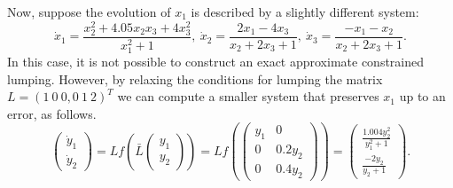Now, suppose the evolution of $x_1$ is described by a slightly different system:
\begin{equation} \label{eq:examplepert}
	\dot{x}_{1} = \frac {x_{2}^{2} +4.05x_{2}x_{3} +4x_{3}^{2}}{x_{1}^{2} + 1 },~
	\dot{x}_{2} = \frac{2x_{1}-4x_{3}}{x_{2}+2x_{3} + 1},~
	\dot{x}_{3} = \frac{-x_{1}-x_{2}}{x_{2}+2x_{3}+1}.
\end{equation}
In this case, it is not possible to construct an exact approximate constrained lumping.
However, by relaxing the conditions for lumping the matrix $L = (1 \ 0\ 0, 0\ 1\  2)^{T}$ we can compute a smaller system that preserves $x_1$ up to an error, as follows.
\begin{equation*}
	\begin{pmatrix}
		\dot{y}_{1} \\
		\dot{y}_{2}
	\end{pmatrix}
	= L f \left(  \bar{L}        \begin{pmatrix}
		y_{1} \\
		y_{2}
	\end{pmatrix}
	\right)
	=
	L f \left(
	\begin{pmatrix}
			y_{1} & 0        \\
			0     & 0.2y_{2} \\
			0     & 0.4y_{2}
		\end{pmatrix} \right)
	=
	\begin{pmatrix}
		\frac{1.004y_{2}^{2}}{y_{1}^{2}+1} \\
		\frac{-2y_{2}}{y_{2}+1}
	\end{pmatrix}.
\end{equation*}
